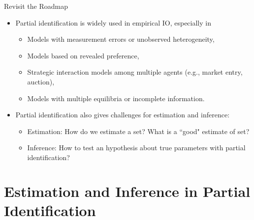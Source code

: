 \documentclass[aspectratio=169]{beamer}  %
\begin{document}
\begin{frame}{Revisit the Roadmap}
    \begin{itemize}
        \item Partial identification is widely used in empirical IO, especially in
        \begin{itemize}
            \item Models with measurement errors or unobserved heterogeneity,
            \item Models based on revealed preference,
            \item Strategic interaction models among multiple agents (e.g., market entry, auction),
            \item Models with multiple equilibria or incomplete information.
        \end{itemize}
    \vspace{0.5cm}
        \item Partial identification also gives challenges for estimation and inference:
        \begin{itemize}
            \item Estimation: How do we estimate a set? What is a ``good" estimate of set?
            \item Inference: How to test an hypothesis about true parameters with partial identification?
        \end{itemize}
    \end{itemize}
\end{frame}

\section{Estimation and Inference in Partial Identification}
\end{document}
